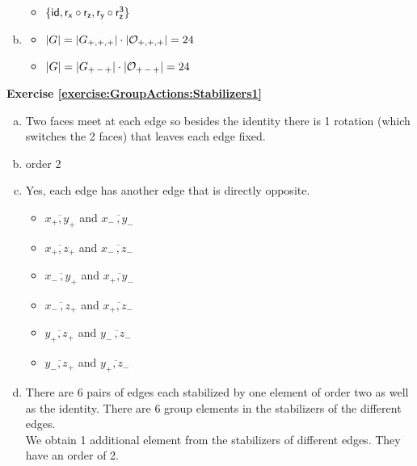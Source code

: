 \begin{enumerate}[(a)]
\begin{itemize}
	\item
	$\{\sf{id}, r_x\circ r_z, r_y\circ r_z^{3}\}$
	\end{itemize}
	
\item
	\begin{itemize}
	\item
	$|G| = |G_{+,+,+}| \cdot |{\cal O}_{+,+,+}| = 24$
	
	\item
	$|G| = |G_{+\,-\,+}| \cdot |{\cal O}_{+\,-\,+}| = 24$
	\end{itemize}
\end{enumerate}

\noindent\textbf{Exercise \ref{exercise:GroupActions:Stabilizers1}}
\begin{enumerate}[(a)]
\item
Two faces meet at each edge so besides the identity there is 1 rotation (which switches the 2 faces)  that leaves each edge fixed.  
 
\item
order 2 

\item
Yes, each edge has another edge that is directly opposite.
	\begin{multicols}{2}
	\begin{itemize}
	\item
	 $\overline{x_+,y_+}$ and $\overline{x_-\,,y_-\,}$
	 
	\item
	 $\overline{x_+,z_+}$ and $\overline{x_-\,,z_-\,}$
	 
	 \item
	 $\overline{x_-\,,y_+}$ and $\overline{x_+,y_-\,}$
	 
	\item
	 $\overline{x_-\,,z_+}$ and $\overline{x_+,z_-\,}$
	 
	 \item
	 $\overline{y_+,z_+}$ and $\overline{y_-\,,z_-\,}$
	 
	 \item
	 $\overline{y_-,z_+}$ and $\overline{y_+,z_-\,}$
	\end{itemize}
	\end{multicols}
	
\item
There are 6 pairs of edges each stabilized by one element of order two as well as the identity.  There are 6 group elements in the stabilizers of the different edges.
\\
We obtain 1 additional element from the stabilizers of different edges.  They have an order of 2.
\end{enumerate}

